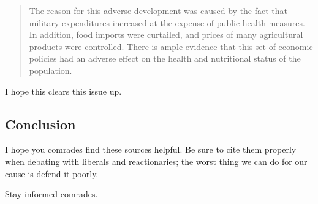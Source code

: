 \begin{quote}
    The reason for this adverse development was caused by the fact that military expenditures increased at the expense of public health measures.
    In addition, food imports were curtailed, and prices of many agricultural products were controlled.
    There is ample evidence that this set of economic policies had an adverse effect on the health and nutritional status of the population.
\end{quote}

I hope this clears this issue up.

\subsection*{Conclusion}

I hope you comrades find these sources helpful.
Be sure to cite them properly when debating with liberals and reactionaries; the worst thing we can do for our cause is defend it poorly.

Stay informed comrades.

